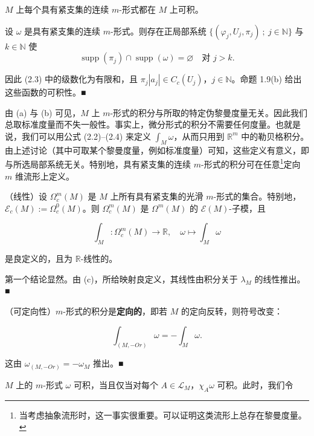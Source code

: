 \begin{remark}
\begin{items}
$ M $ 上每个具有紧支集的连续 $ m $-形式都在 $ M $ 上可积。

\proofhead
设 $ \omega $ 是具有紧支集的连续 $ m $-形式。则存在正局部系统 $ \{(\varphi_j, U_j, \pi_j) \ ; \ j \in \mathbb{N}\} $ 与 $ k \in \mathbb{N} $ 使
\[
\operatorname{supp}(\pi_j) \cap \operatorname{supp}(\omega) = \varnothing \quad \text{对 } j > k .
\]

因此 (2.3) 中的级数化为有限和，且 $ \pi_j |a_j| \in C_c(U_j) $，$ j \in \mathbb{N} $。命题 1.9(b) 给出这些函数的可积性。\nobreak\hspace{0.35em}■

\item

由 (a) 与 (b) 可见，$ M $ 上 $ m $-形式的积分与所取的特定伪黎曼度量无关。因此我们总取标准度量而不失一般性。事实上，微分形式的积分不需要任何度量。也就是说，我们可以用公式 (2.2)–(2.4) 来定义 $ \int_M \omega $，从而只用到 $ \mathbb{R}^m $ 中的勒贝格积分。由上述讨论（其中可取某个黎曼度量，例如标准度量）可知，这些定义有意义，即与所选局部系统无关。特别地，具有紧支集的连续 $ m $-形式的积分可在任意\footnote{当考虑抽象流形时，这一事实很重要。可以证明这类流形上总存在黎曼度量。}定向 $ m $ 维流形上定义。

\item

（线性）设 $ \Omega_c^m(M) $ 是 $ M $ 上所有具有紧支集的光滑 $ m $-形式的集合。特别地，$ \mathcal{E}_c(M) := \Omega_c^0(M) $。则 $ \Omega_c^m(M) $ 是 $ \Omega^m(M) $ 的 $ \mathcal{E}(M) $-子模，且

\[
\int_M : \Omega_c^m(M) \to \mathbb{R} , \quad \omega \mapsto \int_M \omega
\]

是良定义的，且为 $ \mathbb{R} $-线性的。

\proofhead
第一个结论显然。由 (c)，所给映射良定义，其线性由积分关于 $ \lambda_M $ 的线性推出。\nobreak\hspace{0.35em}■
\item

（可定向性）$ m $-形式的积分是\textbf{定向的}，即若 $ M $ 的定向反转，则符号改变：

\[
\int_{(M, -Or)} \omega = - \int_M \omega .
\]

\proofhead
这由 $ \omega_{(M, -Or)} = -\omega_M $ 推出。\nobreak\hspace{0.35em}■
\item

$ M $ 上的 $ m $-形式 $ \omega $ 可积，当且仅当对每个 $ A \in \mathcal{L}_M $，$ \chi_A \omega $ 可积。此时，我们令


\end{items}
\end{remark}
